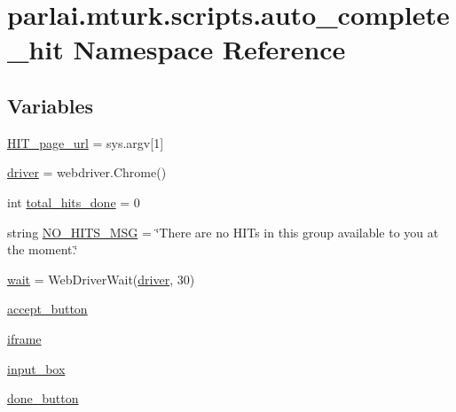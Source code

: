 \hypertarget{namespaceparlai_1_1mturk_1_1scripts_1_1auto__complete__hit}{}\section{parlai.\+mturk.\+scripts.\+auto\+\_\+complete\+\_\+hit Namespace Reference}
\label{namespaceparlai_1_1mturk_1_1scripts_1_1auto__complete__hit}
\subsection*{Variables}
\begin{DoxyCompactItemize}
\item 
\hyperlink{namespaceparlai_1_1mturk_1_1scripts_1_1auto__complete__hit_ad6ca26b2f1c966bd00304cb47a612bd4}{H\+I\+T\+\_\+page\+\_\+url} = sys.\+argv\mbox{[}1\mbox{]}
\item 
\hyperlink{namespaceparlai_1_1mturk_1_1scripts_1_1auto__complete__hit_aa84d687a4e23d5c4cb07ab0c07396a5c}{driver} = webdriver.\+Chrome()
\item 
int \hyperlink{namespaceparlai_1_1mturk_1_1scripts_1_1auto__complete__hit_a5e0869eaab0170f523d6b5fea648b1a1}{total\+\_\+hits\+\_\+done} = 0
\item 
string \hyperlink{namespaceparlai_1_1mturk_1_1scripts_1_1auto__complete__hit_a841a3d5068e1ad07066a7ea28418b5ed}{N\+O\+\_\+\+H\+I\+T\+S\+\_\+\+M\+SG} = \char`\"{}There are no H\+I\+Ts in this group available to you at the moment.\char`\"{}
\item 
\hyperlink{namespaceparlai_1_1mturk_1_1scripts_1_1auto__complete__hit_a41016a44ce805b615732efe5c479551c}{wait} = Web\+Driver\+Wait(\hyperlink{namespaceparlai_1_1mturk_1_1scripts_1_1auto__complete__hit_aa84d687a4e23d5c4cb07ab0c07396a5c}{driver}, 30)
\item 
\hyperlink{namespaceparlai_1_1mturk_1_1scripts_1_1auto__complete__hit_afebd2d6c99ba96ac7f06da75a096702f}{accept\+\_\+button}
\item 
\hyperlink{namespaceparlai_1_1mturk_1_1scripts_1_1auto__complete__hit_a34e374bb9e9600346544be6a7feeb6c2}{iframe}
\item 
\hyperlink{namespaceparlai_1_1mturk_1_1scripts_1_1auto__complete__hit_ac373c84090ad4712c390633f7ff3bb77}{input\+\_\+box}
\item 
\hyperlink{namespaceparlai_1_1mturk_1_1scripts_1_1auto__complete__hit_a5a46afcb5e8b24725e3dbbc7fee116aa}{done\+\_\+button}
\end{DoxyCompactItemize}



